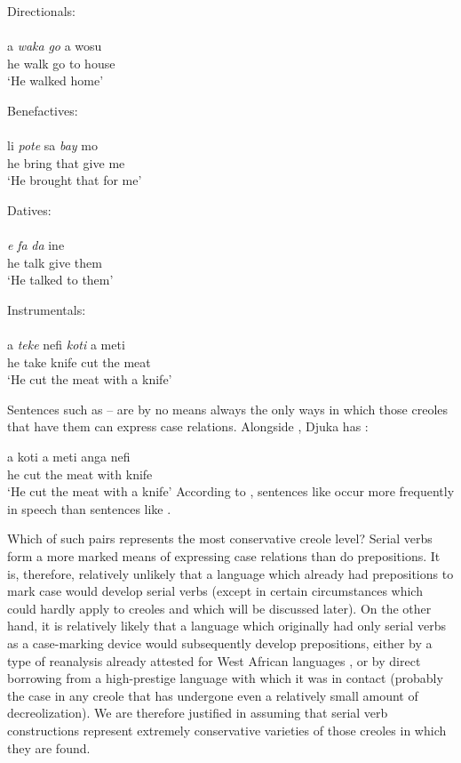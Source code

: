 \ea\label{ex:2:223}
Directionals:\\
\langinfo{\langSR}{}{}\\
\gll a \emph{waka} \emph{go} a wosu\\
he walk go to house \\
\glt `He walked home'
\z

\ea\label{ex:2:224}
Benefactives:\\
\langinfo{\langGU}{}{}\\
\gll li \emph{pote} sa \emph{bay} mo\\
he bring that give me\\
\glt `He brought that for me'
\z

\ea\label{ex:2:225}
Datives:\\
\langinfo{\langST}{}{}\\
\gll \emph{e} \emph{fa} \emph{da} ine \\
he talk give them \\
\glt `He talked to them'
\z

\ea\label{ex:2:226}
Instrumentals:\\
\\
\gll a \emph{teke} nefi \emph{koti} a meti \\
he take knife cut the meat\\
\glt `He cut the meat with a knife'
\z

Sentences such as -- are by no means always the only ways in which those creoles that have them can express case relations. Alongside , Djuka has :

\ea\label{ex:2:227}
\gll a koti a meti anga nefi\\
he cut the meat with knife\\
\glt `He cut the meat with a knife' 
\z
According to \citet{Huttar1975}, sentences like  occur more fre\-quently in speech than sentences like .

Which of such pairs represents the most conservative creole level? Serial verbs form a more marked means of expressing case rela\-tions than do prepositions. It is, therefore, relatively unlikely that a language which already had prepositions to mark case would develop serial verbs (except in certain circumstances which could hardly apply to creoles and which will be discussed later). On the other hand, it is relatively likely that a language which originally had only serial verbs as a case-marking device would subsequently develop prepositions, either by a type of reanalysis already attested for West African languages \citep{Lord1976}, or by direct borrowing from a high-prestige language with which it was in contact (probably the case in any creole that has undergone even a relatively small amount of decreolization). We are therefore justified in assuming that serial verb constructions represent extremely conservative varieties of those creoles in which they are found.

